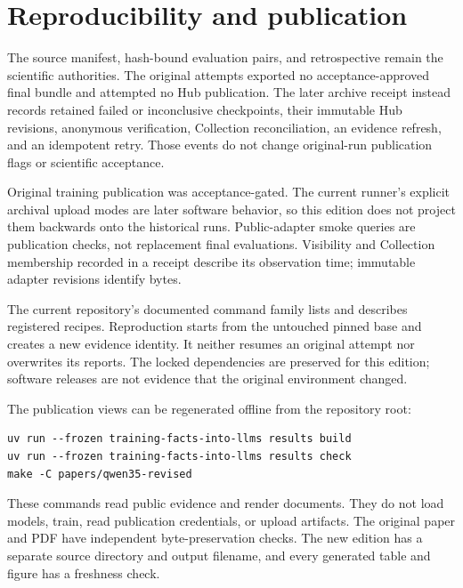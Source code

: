 \section{Reproducibility and publication}
The source manifest, hash-bound evaluation pairs, and retrospective remain the
scientific authorities. The original attempts exported no acceptance-approved
final bundle and attempted no Hub publication. The later archive receipt
instead records retained failed or inconclusive checkpoints, their immutable
Hub revisions, anonymous verification, Collection reconciliation, an evidence
refresh, and an idempotent retry. Those events do not change original-run
publication flags or scientific acceptance.\citep{historicalmanifest,archive}

Original training publication was acceptance-gated. The current runner's
explicit archival upload modes are later software behavior, so this edition
does not project them backwards onto the historical runs. Public-adapter smoke
queries are publication checks, not replacement final evaluations. Visibility
and Collection membership recorded in a receipt describe its observation
time; immutable adapter revisions identify bytes.\citep{retrospective,archive}

The current repository's documented command family lists and describes
registered recipes. Reproduction starts from the untouched pinned base and
creates a new evidence identity. It neither resumes an original attempt nor
overwrites its reports. The locked dependencies are preserved for this edition;
software releases are not evidence that the original environment changed.
\citep{historicalmanifest,retrospective,currentregistry}

The publication views can be regenerated offline from the repository root:
\begin{verbatim}
uv run --frozen training-facts-into-llms results build
uv run --frozen training-facts-into-llms results check
make -C papers/qwen35-revised
\end{verbatim}
These commands read public evidence and render documents. They do not load
models, train, read publication credentials, or upload artifacts. The original
paper and PDF have independent byte-preservation checks. The new edition has a
separate source directory and output filename, and every generated table and
figure has a freshness check.
